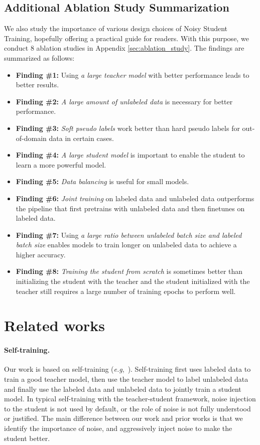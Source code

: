\documentclass[10pt,twocolumn,letterpaper]{article}
\def\eg{\emph{e.g}\onedot}
\begin{document}
\subsection{Additional Ablation Study Summarization}
We also study the importance of various design choices of Noisy Student Training, hopefully offering a practical guide for readers. With this purpose, we conduct 8 ablation studies in Appendix \ref{sec:ablation_study}. The findings are summarized as follows:
\begin{itemize}[itemsep=0em,topsep=0em] 
    \item \textbf{Finding \#1:} Using \emph{a large teacher model} with better performance leads to better results. 
    \item \textbf{Finding \#2:} \emph{A large amount of unlabeled data} is necessary for better performance.
    \item \textbf{Finding \#3:} \emph{Soft pseudo labels} work better than hard pseudo labels for out-of-domain data in certain cases.
    \item \textbf{Finding \#4:} \emph{A large student model} is important to enable the student to learn a more powerful model.
    \item \textbf{Finding \#5:} \emph{Data balancing} is useful for small models.
    \item \textbf{Finding \#6:}  \emph{Joint training} on labeled data and unlabeled data outperforms the pipeline that first pretrains with unlabeled data and then finetunes on labeled data. 
    \item \textbf{Finding \#7:} Using \emph{a large ratio between unlabeled batch size and labeled batch size} enables models to train longer on unlabeled data to achieve a higher accuracy. 
    \item \textbf{Finding \#8:} \emph{Training the student from scratch} is sometimes better than initializing the student with the teacher and the student initialized with the teacher still requires a large number of training epochs to perform well. 
\end{itemize}




\section{Related works}
\label{sec:related_works}

\paragraph{Self-training.} Our work is based on self-training  (\eg,~\cite{scudder1965probability,yarowsky1995unsupervised,riloff2003learning,riloff1996automatically}). 
Self-training first uses labeled data to train a good teacher model, then use the teacher model to label unlabeled data and finally use the labeled data and unlabeled data to jointly train a student model. 
In typical self-training with the teacher-student framework, noise injection to the student is not used by default, or the role of noise is not fully understood or justified. The main difference between our work and prior works is that we identify the importance of noise, and aggressively inject noise to make the student better.
\end{document}
